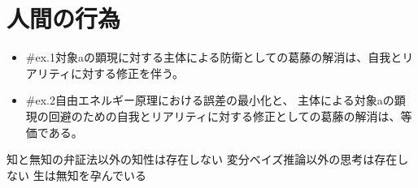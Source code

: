 \section{人間の行為}\label{ux4ebaux9593ux306eux884cux70ba}

\begin{note}{}
  \begin{itemize}
    \tightlist
    \item{\#ex.1}対象aの顕現に対する主体による防衛としての葛藤の解消は、自我とリアリティに対する修正を伴う。
    \item{\#ex.2}自由エネルギー原理における誤差の最小化と、  主体による対象aの顕現の回避のための自我とリアリティに対する修正としての葛藤の解消は、等価である。
  \end{itemize}
\end{note}

知と無知の弁証法以外の知性は存在しない
変分ベイズ推論以外の思考は存在しない 生は無知を孕んでいる
